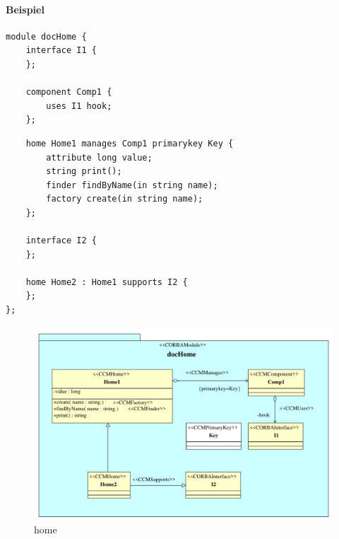 \documentclass [a4paper,10pt] {scrartcl}
\begin{document}
\paragraph{Beispiel}
\begin{verbatim}
module docHome {
    interface I1 {
    };

    component Comp1 {
        uses I1 hook;
    };
\end{verbatim}
\newpage
\begin{verbatim}
    home Home1 manages Comp1 primarykey Key {
        attribute long value;
        string print();
        finder findByName(in string name);
        factory create(in string name);
    };

    interface I2 {
    };

    home Home2 : Home1 supports I2 {
    };
};
\end{verbatim}
\begin{figure}[!h]
\centerline{\includegraphics[width=1.2 \linewidth]{docHome}}
\caption{home}
\label{fig:home}
\end{figure}

\cleardoublepage
\end{document}
